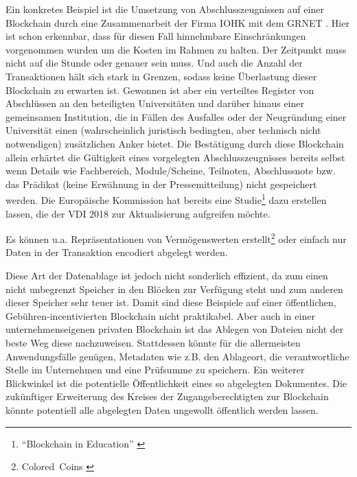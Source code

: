 Ein konkretes Beispiel ist die Umsetzung von Abschlusszeugnissen auf einer Blockchain durch eine Zusammenarbeit der Firma IOHK mit dem \gls{GRNET} \autocite{w:abschluesse-blockchain}. Hier ist schon erkennbar, dass für diesen Fall hinnehmbare Einschränkungen vorgenommen wurden um die Kosten im Rahmen zu halten. Der Zeitpunkt muss nicht auf die Stunde oder genauer sein muss. Und auch die Anzahl der Transaktionen hält sich stark in Grenzen, sodass keine Überlastung dieser Blockchain zu erwarten ist. Gewonnen ist aber ein verteiltes Register von Abschlüssen an den beteiligten Universitäten und darüber hinaus einer gemeinsamen Institution, die in Fällen des Ausfalles oder der Neugründung einer Universität einen (wahrscheinlich juristisch bedingten, aber technisch nicht notwendigen) zusätzlichen Anker bietet. Die Bestätigung durch diese Blockchain allein erhärtet die Gültigkeit eines vorgelegten Abschlusszeugnisses bereits selbst wenn Details wie Fachbereich, Module/Scheine, Teilnoten, Abschlussnote bzw. das Prädikat (keine Erwähnung in der Pressemitteilung) nicht gespeichert werden. Die Europäische Kommission hat bereits eine Studie\footnote{\enquote{Blockchain in Education} \autocite{p:bc-edu-eurocommission}} dazu erstellen lassen, die der \gls{VDI} 2018 zur Aktualisierung aufgreifen möchte.

Es können u.a. Repräsentationen von Vermögenswerten erstellt\footnote{Colored~Coins \autocite{b:mastering-bitcoin}%
} oder einfach nur Daten in der Transaktion encodiert abgelegt werden.

Diese Art der Datenablage ist jedoch nicht sonderlich effizient, da zum einen nicht unbegrenzt Speicher in den Blöcken zur Verfügung steht und zum anderen dieser Speicher sehr teuer ist. Damit sind diese Beispiele auf einer öffentlichen, Gebühren-incentivierten Blockchain nicht praktikabel. Aber auch in einer unternehmenseigenen privaten Blockchain ist das Ablegen von Dateien nicht der beste Weg diese nachzuweisen. Stattdessen könnte für die allermeisten Anwendungsfälle genügen, Metadaten wie z.B. den Ablageort, die verantwortliche Stelle im Unternehmen und eine Prüfsumme zu speichern. Ein weiterer Blickwinkel ist die potentielle Öffentlichkeit eines so abgelegten Dokumentes. Die zukünftiger Erweiterung des Kreises der Zugangsberechtigten zur Blockchain könnte potentiell alle abgelegten Daten ungewollt öffentlich werden lassen.



